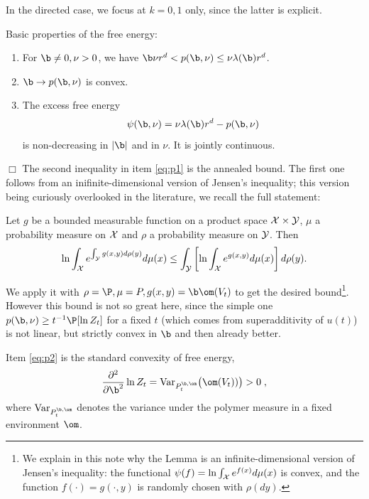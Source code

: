  In the directed case, we focus at $k=0,1$ only, since the latter is explicit.
%
\begin{proposition} \label{prop:p}
Basic properties of the free energy:
\begin{enumerate}
\item \label{eq:p1} For $\b \neq 0, \nu >0$, we have
$ \b \nu r^d < p(\b, \nu) \leq \nu \lambda(\b)r^d$.
\item \label{eq:p2}
$ \b \to p(\b, \nu)$ is convex.
\item \label{eq:p3} The excess free energy 
\begin{equation}
\label{def:excessfreeenergy}   
 \psi(\b,\nu)=\nu \lambda(\b)r^d- p(\b, \nu)
\end{equation}
is non-decreasing in $|\b|$ and in $\nu$. It is jointly continuous. 
\end{enumerate}
\end{proposition}
\noindent
$\Box$ The second inequality in item \ref{eq:p1} is the annealed bound. The first one follows from an inifinite-dimensional version of Jensen's
inequality; this version being curiously overlooked in the literature, we recall the full statement:
\begin{lemma}\label{lem:RAS-J}
Let $g$ be a bounded measurable function on a product space ${\cal X} \times  {\cal Y}$, $\mu$ a probability measure on $\cal X$ and $\rho$ a probability measure on $\cal Y$. Then
$$
\ln \int_{\cal X} e^{\int_{\cal Y}  g(x,y) d\rho (y) } d \mu(x) \leq \int_{\cal Y}  \left[ \ln \int_{\cal X}  e^{g(x,y)} d\mu (x) \right] d \rho(y) .
$$
\end{lemma}
We apply it with $\rho=\P, \mu=P, g(x,y)=\b \om(V_t)$ to get the desired bound\footnote{We explain in this note 
why the Lemma is an infinite-dimensional version of Jensen's inequality:  
the functional $\psi(f)= \ln \int_{\cal X} e^{f(x)} d\mu(x)$ is convex, and the function $f(\cdot)=g(\cdot, y)$ is randomly chosen with $\rho(dy)$.}.
However this bound is not so great here, since the simple one $p(\b,\nu) \geq t^{-1} \P[ \ln Z_t]$ for a fixed $t$ (which comes from superadditivity of $u(t)$)
is not linear, but strictly convex in $\b$ and then already better.
%
%

Item \ref{eq:p2} is the standard convexity of free energy, 
$$
\frac{\partial^2}{\partial \b^2} \ln Z_t = {\rm Var}_{\gibbs} \big( \om(V_t)) \big) > 0\;,
$$
where ${\rm Var}_{\gibbs}$ denotes the variance under the polymer measure in a fixed environment $\om$.

